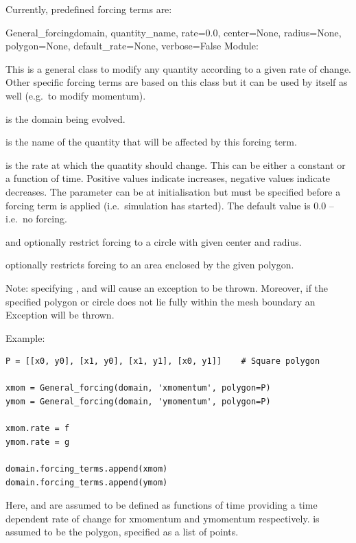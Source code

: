 \documentclass{manual}
\begin{document}
Currently, predefined forcing terms are: \\
\begin{classdesc}{General_forcing}{domain,
                                  quantity_name,
                                  rate=0.0,
                                  center=None,
                                  radius=None,
                                  polygon=None,
                                  default_rate=None,
                                  verbose=False}
Module: 

This is a general class to modify any quantity according to a given rate of change.
Other specific forcing terms are based on this class but it can be used by itself as well (e.g.\ to modify momentum).

 is the domain being evolved.

 is the name of the quantity that will be affected by this forcing term.

 is the rate at which the quantity should change. This can be either a constant or a
function of time. Positive values indicate increases, negative values indicate decreases.
The parameter  can be  at initialisation but must be specified
before a forcing term is applied (i.e.\ simulation has started).
The default value is 0.0 -- i.e.\ no forcing.

 and  optionally restrict forcing to a circle with given center and radius.

 optionally restricts forcing to an area enclosed by the given polygon.

Note: specifying ,  and  will cause an exception to be thrown.
Moreover, if the specified polygon or circle does not lie fully within the mesh boundary an Exception will be thrown.

Example:

\begin{verbatim}
P = [[x0, y0], [x1, y0], [x1, y1], [x0, y1]]    # Square polygon

xmom = General_forcing(domain, 'xmomentum', polygon=P)
ymom = General_forcing(domain, 'ymomentum', polygon=P)

xmom.rate = f
ymom.rate = g

domain.forcing_terms.append(xmom)
domain.forcing_terms.append(ymom)
\end{verbatim}

Here,  and  are assumed to be defined as functions of time providing
a time dependent rate of change for xmomentum and ymomentum respectively.
 is assumed to be the polygon, specified as a list of points.
\end{classdesc}
\end{document}
